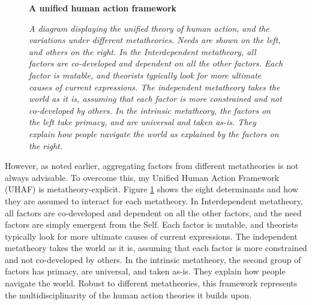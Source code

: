 \documentclass[12 pt]{article}
\begin{document}
   \begin{figure}
   	\centering
   	\textbf{A unified human action framework}\par \medskip
   	
   	\caption{\textit{A diagram displaying the unified theory of human action, and the variations under different metatheories. Needs are shown on the left, and others on the right. In the Interdependent metatheory, all factors are co-developed and dependent on all the other factors. Each factor is mutable, and theorists typically look for more ultimate causes of current expressions. The independent metatheory takes the world as it is, assuming that each factor is more constrained and not co-developed by others. In the intrinsic metatheory, the factors on the left take primacy, and are universal and taken as-is. They explain how people navigate the world as explained by the factors on the right.}}
   	\label{fig:unifidag}
   \end{figure}
   
 However, as noted earlier, aggregating factors from different metatheories is not always advisable. To overcome this, my Unified Human Action Framework (UHAF) is metatheory-explicit. Figure \ref{fig:unifidag} shows the eight determinants and how they are assumed to interact for each metatheory. In Interdependent metatheory, all factors are co-developed and dependent on all the other factors, and the need factors are simply emergent from the Self. Each factor is mutable, and theorists typically look for more ultimate causes of current expressions. The independent metatheory takes the world as it is, assuming that each factor is more constrained and not co-developed by others. In the intrinsic metatheory, the second group of factors has primacy, are universal, and taken as-is. They explain how people navigate the world.  Robust to different metatheories, this framework represents the multidisciplinarity of the human action theories it builds upon.  
  
\end{document}
